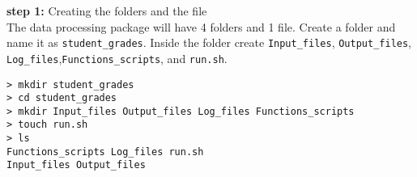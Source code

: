 \textbf{step 1:} Creating the folders and the file \\

\noindent
The data processing package will have 4 folders and 1 file. Create a folder and name it as \texttt{student\_grades}. Inside the folder create \texttt{Input\_files}, \texttt{Output\_files}, \texttt{Log\_files},\texttt{Functions\_scripts}, and \texttt{run.sh}.

\begin{mdframed}[hidealllines=true,backgroundcolor=gray!20]
\fontsize{10pt}{1pt}
\begin{singlespace}
\texttt{> mkdir student\_grades\\
> cd student\_grades\\
> mkdir Input\_files Output\_files Log\_files Functions\_scripts \\
> touch run.sh\\
> ls\\
Functions\_scripts\   Log\_files\   run.sh \\
Input\_files\  Output\_files
 }
 \end{singlespace}
\end{mdframed}


